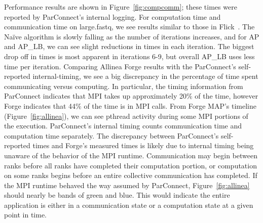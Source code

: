 \documentclass[11pt]{elsarticle}
\begin{document}
Performance results are shown in Figure~\ref{fig:compcomm}; these times were reported by ParConnect's internal logging.
For computation time and communication time on large.fastq, we see results similar to those in Flick~\cite{Flick:2015}. The Na{\"i}ve algorithm is slowly falling as the number of iterations increases, and for AP and AP\_LB, we can see slight reductions in times in each iteration. The biggest drop off in times is most apparent in iterations 6-9, but overall AP\_LB uses less time per iteration. Comparing Allinea Forge results with the ParConnect's self-reported internal-timing, we see a big discrepancy in the percentage of time spent communicating versus computing. In particular, the timing information from ParConnect indicates that MPI takes up approximately 20\% of the time, however Forge indicates that 44\% of the time is in MPI calls. From Forge MAP's timeline (Figure~\ref{fig:allinea}), we can see pthread activity during some MPI portions of the execution. ParConnect's internal timing counts communication time and computation time separately. The discrepancy between ParConnect's self-reported times and Forge's measured times is likely due to internal timing being unaware of the behavior of the MPI runtime. Communication may begin between ranks before all ranks have completed their computation portion, or computation on some ranks begins before an entire collective communication has completed. If the MPI runtime behaved the way assumed by ParConnect, Figure~\ref{fig:allinea} should nearly be bands of green and blue. This would indicate the entire application is either in a communication state or a computation state at a given point in time.
\end{document}
